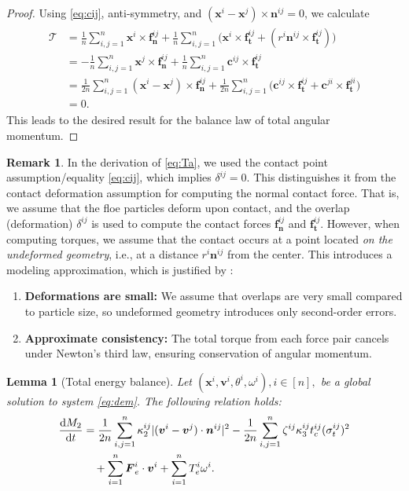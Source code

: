 \documentclass[a4paper,11pt]{article}
\numberwithin{equation}{section}
\newtheorem{lemma}[theorem]{Lemma}
\theoremstyle{definition}
\newtheorem{remark}[theorem]{Remark}
\newcommand{\bfx}{\boldsymbol{x}}
\newcommand{\bfv}{\boldsymbol{v}}
\newcommand{\bfn}{\boldsymbol{n}}
\newcommand{\bft}{\boldsymbol{t}}
\newcommand{\bff}{\boldsymbol{f}}
\newcommand{\bfF}{\boldsymbol{F}}
\newcommand{\bfc}{\boldsymbol{c}}
\def\d{{  \rm d}}
\newcommand{\T}{\mathcal{T}}
\begin{document}
\begin{proof}
Using \eqref{eq:cij}, anti-symmetry, and $(\bfx^i - \bfx^j) \times \bfn^{ij}= 0$, we calculate 
\begin{align}\label{eq:Ta}
\begin{aligned}
\T & = \frac{1}{n}  \sum_{i,j=1}^n \bfx^i \times \bff_{\bfn}^{ij} + \frac{1}{n}  \sum_{i,j=1}^n \big( \bfx^i \times \bff_{\bft}^{ij} + ( r^i\bfn^{ij}\times \bff_{\bft}^{ij}) \big) \\
& = - \frac{1}{n}  \sum_{i,j=1}^n \bfx^j \times \bff_{\bfn}^{ij} + \frac{1}{n}  \sum_{i,j=1}^n \bfc^{ij}\times \bff_{\bft}^{ij} \\
& = \frac{1}{2n}  \sum_{i,j=1}^n (\bfx^i - \bfx^j) \times \bff_{\bfn}^{ij} + \frac{1}{2n}  \sum_{i,j=1}^n \big( \bfc^{ij}\times \bff_{\bft}^{ij} + \bfc^{ji}\times \bff_{\bft}^{ji} \big) \\
& = 0.
\end{aligned}
\end{align}
This leads to the desired result for the balance law of total angular momentum.
\end{proof}
%
\begin{remark}
In the derivation of \eqref{eq:Ta}, we used the contact point assumption/equality \eqref{eq:cij}, which implies $\delta^{ij} =0$. This distinguishes it from the contact deformation assumption for computing the normal contact force. 
That is, we assume that the floe particles deform upon contact, and the overlap (deformation) \( \delta^{ij} \) is used to compute the contact forces \( \bm{f}_{\bm{n}}^{ij} \) and \( \bm{f}_{\bm{t}}^{ij} \). However, when computing torques, we assume that the contact occurs at a point located \emph{on the undeformed geometry}, i.e., at a distance \( r^i \bm{n}^{ij} \) from the center.
%
This introduces a modeling approximation, which is justified by \cite{poschel2005computational,luding2008introduction}:
\begin{enumerate}
  \item \textbf{Deformations are small:} We assume that overlaps are very small compared to particle size, so undeformed geometry introduces only second-order errors. 
  \item \textbf{Approximate consistency:} The total torque from each force pair cancels under Newton's third law, ensuring conservation of angular momentum.
\end{enumerate}
\end{remark}


\begin{lemma}[Total energy balance] \label{lem:sumparticleE}
Let $(\bfx^i, \bfv^i, \theta^i, \omega^i), i\in [n],$ be a global solution to system \eqref{eq:dem}. The following  relation holds:
\begin{align}
\begin{aligned} \label{eq:dtM2}
\frac{\d M_2}{\d t}  & =  \frac{1}{2n} \sum_{i, j=1}^n  \kappa^{ij}_2 |(\bfv^i - \bfv^j )\cdot\bfn^{ij} |^2 
- \frac{1}{2n}  \sum_{i, j=1}^n  \zeta^{ij} \kappa^{ij}_3 t_c^{ij} (\sigma^{ij}_t)^2 \\
& \quad + \sum_{i=1}^{n} \bfF^i_e \cdot \bfv^i + \sum_{i=1}^{n} T^i_e \omega^i.
\end{aligned}
\end{align}
\end{lemma}
\end{document}
